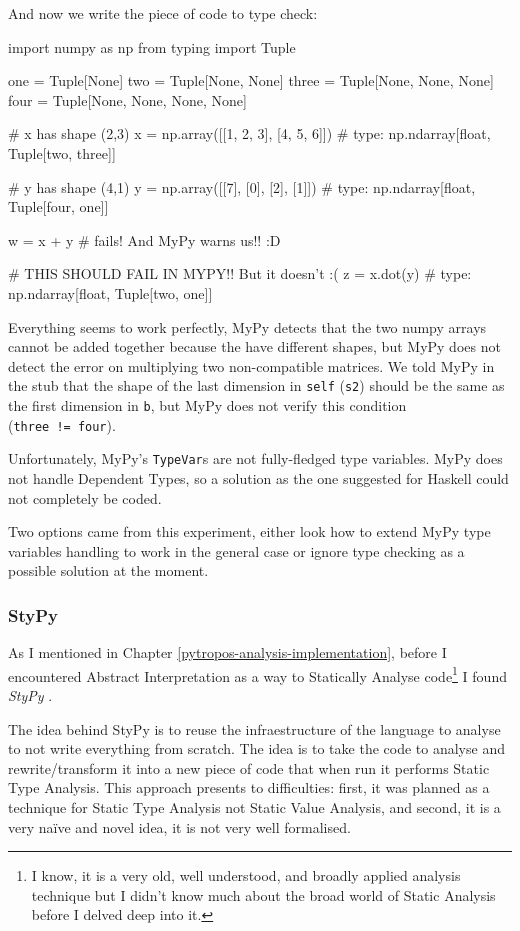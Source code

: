 And now we write the piece of code to type check:

\begin{pythoncode}
import numpy as np
from typing import Tuple

one   = Tuple[None]
two   = Tuple[None, None]
three = Tuple[None, None, None]
four  = Tuple[None, None, None, None]

# x has shape (2,3)
x = np.array([[1, 2, 3], [4, 5, 6]])  # type: np.ndarray[float, Tuple[two, three]]

# y has shape (4,1)
y = np.array([[7], [0], [2], [1]])    # type: np.ndarray[float, Tuple[four, one]]

w = x + y  # fails! And MyPy warns us!! :D

# THIS SHOULD FAIL IN MYPY!! But it doesn't :(
z = x.dot(y)  # type: np.ndarray[float, Tuple[two, one]]
\end{pythoncode}

Everything seems to work perfectly, MyPy detects that the two numpy
arrays cannot be added together because the have different shapes, but
MyPy does not detect the error on multiplying two non-compatible
matrices. We told MyPy in the stub that the shape of the last dimension
in \texttt{self} (\texttt{s2}) should be the same as the first dimension
in \texttt{b}, but MyPy does not verify this condition
(\texttt{three\ !=\ four}).

Unfortunately, MyPy's \texttt{TypeVar}s are not fully-fledged type
variables. MyPy does not handle Dependent Types, so a solution as the
one suggested for Haskell could not completely be coded.

Two options came from this experiment, either look how to extend MyPy
type variables handling to work in the general case or ignore type
checking as a possible solution at the moment.

\subsubsection*{StyPy}

As I mentioned in Chapter \ref{pytropos-analysis-implementation}, before
I encountered Abstract Interpretation as a way to Statically Analyse
code\footnote{I know, it is a very old, well understood, and broadly
  applied analysis technique but I didn't know much about the broad
  world of Static Analysis before I delved deep into it.} I found
\emph{StyPy} \autocite{ortin_towards_2015}.

The idea behind StyPy is to reuse the infraestructure of the language to
analyse to not write everything from scratch. The idea is to take the
code to analyse and rewrite/transform it into a new piece of code that
when run it performs Static Type Analysis. This approach presents to
difficulties: first, it was planned as a technique for Static Type
Analysis not Static Value Analysis, and second, it is a very naïve and
novel idea, it is not very well formalised.

